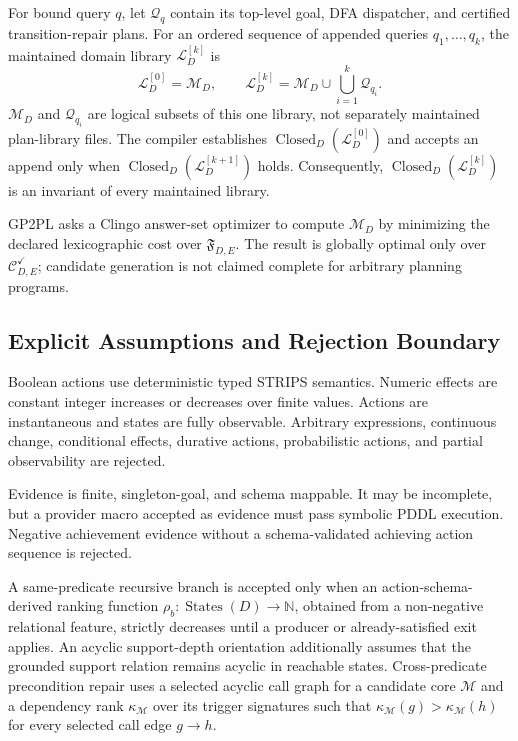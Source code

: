 \begin{definition}
For bound query $q$, let $\mathcal Q_q$ contain its top-level goal, DFA
dispatcher, and certified transition-repair plans. For an ordered sequence of
appended queries $q_1,\ldots,q_k$, the maintained domain library
$\mathcal L_D^{[k]}$ is
\[
\mathcal L_D^{[0]}=\mathcal M_D,
\qquad
\mathcal L_D^{[k]}=
\mathcal M_D\cup\bigcup_{i=1}^{k}\mathcal Q_{q_i}.
\]
$\mathcal M_D$ and $\mathcal Q_{q_i}$ are logical subsets of this one library,
not separately maintained plan-library files. The compiler establishes
$\operatorname{Closed}_D(\mathcal L_D^{[0]})$ and accepts an append only when
$\operatorname{Closed}_D(\mathcal L_D^{[k+1]})$ holds. Consequently,
$\operatorname{Closed}_D(\mathcal L_D^{[k]})$ is an invariant of every
maintained library.
\end{definition}

GP2PL asks a Clingo answer-set optimizer \cite{Gebser2018Clingo} to compute
$\mathcal M_D$ by minimizing the declared lexicographic cost over
$\mathfrak F_{D,E}$. The result is globally optimal only over
$\mathcal C^{\checkmark}_{D,E}$; candidate generation is not claimed complete
for arbitrary planning programs.

\subsection{Explicit Assumptions and Rejection Boundary}

\begin{assumption}
Boolean actions use deterministic typed STRIPS semantics. Numeric effects are
constant integer increases or decreases over finite values. Actions are
instantaneous and states are fully observable. Arbitrary expressions,
continuous change, conditional effects, durative actions, probabilistic actions,
and partial observability are rejected.
\end{assumption}

\begin{assumption}
Evidence is finite, singleton-goal, and schema mappable. It may be incomplete,
but a provider macro accepted as evidence must pass symbolic PDDL execution.
Negative achievement evidence without a schema-validated achieving action
sequence is rejected.
\end{assumption}

\begin{assumption}
A same-predicate recursive branch is accepted only when an action-schema-derived
ranking function $\rho_b:\operatorname{States}(D)\rightarrow\mathbb N$,
obtained from a non-negative relational feature, strictly decreases until a producer or
already-satisfied exit applies. An acyclic support-depth orientation additionally
assumes that the grounded support relation remains acyclic in reachable states.
Cross-predicate precondition repair uses a selected acyclic call graph for a
candidate core $\mathcal M$ and a dependency rank $\kappa_{\mathcal M}$ over
its trigger signatures such that
$\kappa_{\mathcal M}(g)>\kappa_{\mathcal M}(h)$ for every selected call edge
$g\rightarrow h$.
\end{assumption}

